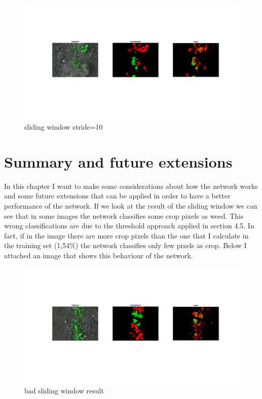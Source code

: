 \documentclass[]{report}
\begin{document}
\begin{figure}[h]
  \includegraphics[width=\linewidth]{6.png}
  \caption{sliding window stride=10}\label{fig:sliding window 10 2}

\end{figure}


\chapter{Summary and future extensions}

In this chapter I want to make some considerations about how the network works and some future extensions that can be applied in order to have a better performance of the network.
If we look at the result of the sliding window we can see that in some images the network classifies some crop pixels as weed. This wrong classifications are due to the threshold approach applied in section 4.5. In fact, if in the image there are more crop pixels than the one that I calculate in the training set (1,54\%) the network classifies only few pixels as crop. Below I attached an image that shows this behaviour of the network.

\begin{figure}[h]
	\begin{center}
		\includegraphics[width=\linewidth]{15.png}
		\caption{bad sliding window result}
		\label{fig:bad sliding window result}
	\end{center}
\end{figure}
\newpage
\end{document}
